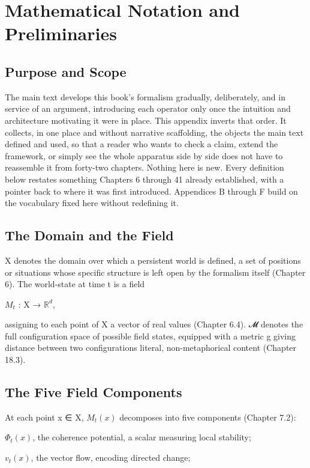 \chapter{Mathematical Notation and Preliminaries}

\section{Purpose and Scope}

The main text develops this book's formalism gradually, deliberately, and in service of an argument, introducing each operator only once the intuition and architecture motivating it were in place. This appendix inverts that order. It collects, in one place and without narrative scaffolding, the objects the main text defined and used, so that a reader who wants to check a claim, extend the framework, or simply see the whole apparatus side by side does not have to reassemble it from forty-two chapters. Nothing here is new. Every definition below restates something Chapters 6 through 41 already established, with a pointer back to where it was first introduced. Appendices B through F build on the vocabulary fixed here without redefining it.

\section{The Domain and the Field}

X denotes the domain over which a persistent world is defined, a set of positions or situations whose specific structure is left open by the formalism itself (Chapter 6). The world-state at time t is a field

\(M_t\) : X → \(\mathbb{R}^d\),

assigning to each point of X a vector of real values (Chapter 6.4). 𝓜 denotes the full configuration space of possible field states, equipped with a metric g giving distance between two configurations literal, non-metaphorical content (Chapter 18.3).

\section{The Five Field Components}

At each point x ∈ X, \(M_t(x)\) decomposes into five components (Chapter 7.2):

\(\Phi_t(x)\), the coherence potential, a scalar measuring local stability;

\(v_t(x)\), the vector flow, encoding directed change;

